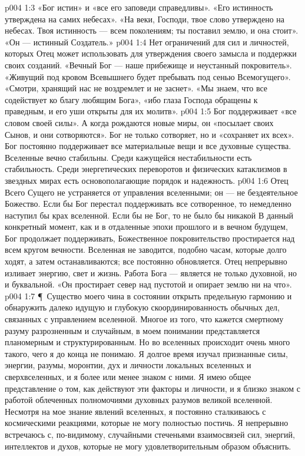 \vs p004 1:3 «Бог истин» и «все его заповеди справедливы». «Его истинность утверждена на самих небесах». «На веки, Господи, твое слово утверждено на небесах. Твоя истинность --- всем поколениям; ты поставил землю, и она стоит». «Он --- истинный Создатель.»
\vs p004 1:4 Нет ограничений для сил и личностей, которых Отец может использовать для утверждения своего замысла и поддержки своих созданий. «Вечный Бог --- наше прибежище и неустанный покровитель». «Живущий под кровом Всевышнего будет пребывать под сенью Всемогущего». «Смотри, хранящий нас не воздремлет и не заснет». «Мы знаем, что все содействует ко благу любящим Бога», «ибо глаза Господа обращены к праведным, и его уши открыты для их молитв».
\vs p004 1:5 Бог поддерживает «все словом своей силы». А когда рождаются новые миры, он «посылает своих Сынов, и они сотворяются». Бог не только сотворяет, но и «сохраняет их всех». Бог постоянно поддерживает все материальные вещи и все духовные существа. Вселенные вечно стабильны. Среди кажущейся нестабильности есть стабильность. Среди энергетических переворотов и физических катаклизмов в звездных мирах есть основополагающие порядок и надежность.
\vs p004 1:6 Отец Всего Сущего не устраняется от управления вселенными; он --- не бездеятельное Божество. Если бы Бог перестал поддерживать все сотворенное, то немедленно наступил бы крах вселенной. Если бы не Бог, то не было бы никакой  В данный конкретный момент, как и в отдаленные эпохи прошлого и в вечном будущем, Бог продолжает поддерживать, Божественное покровительство простирается над всем кругом вечности. Вселенная не заводится, подобно часам, которые долго ходят, а затем останавливаются; все постоянно обновляется. Отец непрерывно изливает энергию, свет и жизнь. Работа Бога --- является не только духовной, но и буквальной. «Он простирает север над пустотой и опирает землю ни на что».
\vs p004 1:7 \P\ Существо моего чина в состоянии открыть предельную гармонию и обнаружить далеко идущую и глубокую скоординированность обычных дел, связанных с управлением вселенной. Многое из того, что кажется смертному разуму разрозненным и случайным, в моем понимании представляется планомерным и структурированным. Но во вселенных происходит очень много такого, чего я до конца не понимаю. Я долгое время изучал признанные силы, энергии, разумы, моронтии, дух и личности локальных вселенных и сверхвселенных, и я более или менее знаком с ними. Я имею общее представление о том, как действуют эти факторы и личности, и я близко знаком с работой облеченных полномочиями духовных разумов великой вселенной. Несмотря на мое знание явлений вселенных, я постоянно сталкиваюсь с космическими реакциями, которые не могу полностью постичь. Я непрерывно встречаюсь с, по\hyp{}видимому, случайными стеченьями взаимосвязей сил, энергий, интеллектов и духов, которые не могу удовлетворительным образом объяснить.
